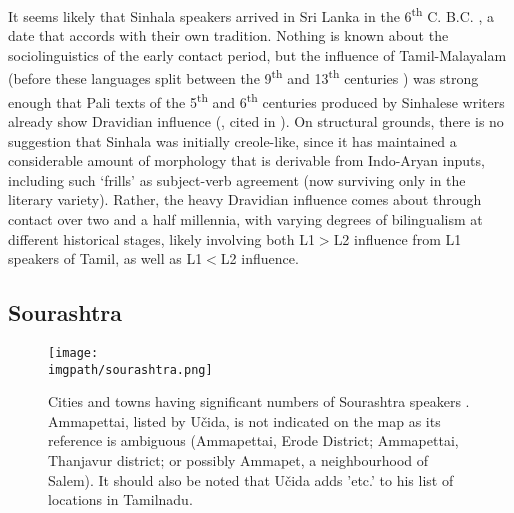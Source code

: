 It seems likely that Sinhala speakers arrived in Sri Lanka in the 6\textsuperscript{th} C. B.C. \citep[200]{Gair1976verbsinhala}, a date that accords with their own tradition. Nothing is known about the sociolinguistics of the early contact period, but the influence of Tamil-Malayalam (before these languages split between the 9\textsuperscript{th} and 13\textsuperscript{th} centuries \citep[502]{Krishnamurti2003}) was strong enough that Pali texts of the 5\textsuperscript{th} and 6\textsuperscript{th} centuries produced by Sinhalese writers already show Dravidian influence (\citet[vi]{RhysEtAl1921}, cited in \citet[200]{Gair1976verbsinhala}). On structural grounds, there is no suggestion that Sinhala was initially creole-like, since it has maintained a considerable amount of morphology that is derivable from Indo-Aryan inputs, including such `frills' as subject-verb agreement (now surviving only in the literary variety). Rather, the heavy Dravidian influence comes about through contact over two and a half millennia, with varying degrees of bilingualism at different historical stages, likely involving both L1$>$L2 influence from L1 speakers of Tamil, as well as L1$<$L2 influence. 

\subsection{Sourashtra}
\begin{figure}
\texttt{[image: \\imgpath/sourashtra.png]}
 \caption[Sourashtra cities and towns]{Cities and towns having significant numbers of Sourashtra speakers  
\citep[following][3]{Ucida1979}. Ammapettai, listed by U\v{c}ida, is not indicated on the map as its reference is ambiguous (Ammapettai, Erode District; Ammapettai, Thanjavur district; or possibly Ammapet, a neighbourhood of Salem). It should also be noted that U\v{c}ida adds 'etc.' to his list of locations in Tamilnadu.
}
 \label{smith:fig:sourashtra}
\end{figure}


